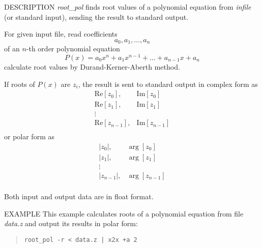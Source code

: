 \begin{synopsis}
\item [root\_pol] [ --m $M$ ] [ --n $N$ ] [ --e $E$ ] [ --i ]
 [ --s ] [ --r ] [ {\em infile} ]
\end{synopsis}

\begin{qsection}{DESCRIPTION}
{\em root\_pol} finds root values of a polynomial equation
from {\em infile} (or standard input), 
sending the result to standard output.

For given input file, read coefficients
\begin{displaymath}
  a_0, a_1, \dots, a_n
\end{displaymath}
of an $n$-th order polynomial equation
\begin{displaymath}
  P(x) = a_0x^n + a_1x^{n-1} + \dots + a_{n-1}x + a_n
\end{displaymath}
calculate root values by Durand-Kerner-Aberth method.
\par
If roots of $P(x)$ are $z_i$, 
the result is sent to standard output 
in complex form as
\begin{displaymath}
   \begin{matrix}
   \mathrm{Re}[z_0], & \mathrm{Im}[z_0] \\
   \mathrm{Re}[z_1], & \mathrm{Im}[z_1] \\
   \vdots            &                  \\
   \mathrm{Re}[z_{n-1}], & \mathrm{Im}[z_{n-1}] \\
   \end{matrix}
\end{displaymath}
or polar form as
\begin{displaymath}
   \begin{matrix}
   |z_0|, & \arg[z_0] \\
   |z_1|, & \arg[z_1] \\
   \vdots &           \\
   |z_{n-1}|, & \arg[z_{n-1}] \\
   \end{matrix}
\end{displaymath}
\par
Both input and output data are in float format.
\end{qsection}

\begin{options}
\end{options}

\begin{qsection}{EXAMPLE}
This example calculates roots of a polynomial equation from file {\em data.z}
and output its results in polar form:
\begin{quote}
 \verb!root_pol -r < data.z | x2x +a 2!
\end{quote}
\end{qsection}

% 
